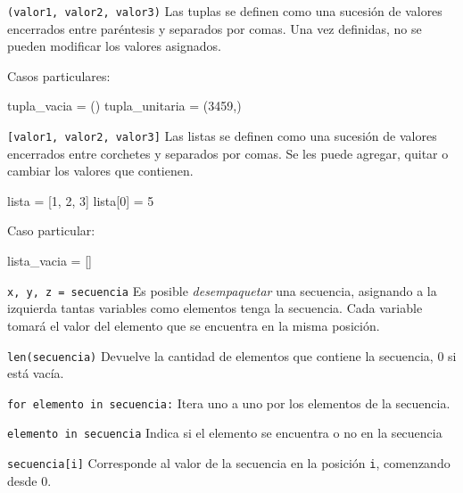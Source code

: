 \begin{referencia_python}

\begin{sintaxis}{\lstinline!(valor1, valor2, valor3)!}
Las tuplas se definen como una sucesión de valores encerrados entre paréntesis
y separados por comas. Una vez definidas, no se pueden modificar los valores
asignados.

Casos particulares:
\begin{codigo-python-sn}
tupla_vacia = ()
tupla_unitaria = (3459,)
\end{codigo-python-sn}
\end{sintaxis}

\begin{sintaxis}{\lstinline![valor1, valor2, valor3]!}
Las listas se definen como una sucesión de valores encerrados entre corchetes y
separados por comas. Se les puede agregar, quitar o cambiar los valores que
contienen.

\begin{codigo-python-sn}
lista = [1, 2, 3]
lista[0] = 5
\end{codigo-python-sn}

Caso particular:
\begin{codigo-python-sn}
lista_vacia = []
\end{codigo-python-sn}
\end{sintaxis}

\begin{sintaxis}{\lstinline!x, y, z = secuencia!}
Es posible {\it desempaquetar} una secuencia, asignando a la izquierda
tantas variables como elementos tenga la secuencia. Cada variable
tomará el valor del elemento que se encuentra en la misma posición.
\end{sintaxis}

\begin{sintaxis}{\lstinline!len(secuencia)!}
Devuelve la cantidad de elementos que contiene la secuencia, 0 si está vacía.
\end{sintaxis}

\begin{sintaxis}{\lstinline!for elemento in secuencia:!}
Itera uno a uno por los elementos de la secuencia.
\end{sintaxis}

\begin{sintaxis}{\lstinline!elemento in secuencia!}
Indica si el elemento se encuentra o no en la secuencia
\end{sintaxis}

\begin{sintaxis}{\lstinline!secuencia[i]!}
Corresponde al valor de la secuencia en la posición \lstinline!i!, comenzando
desde 0.


\end{sintaxis}
\end{referencia_python}
